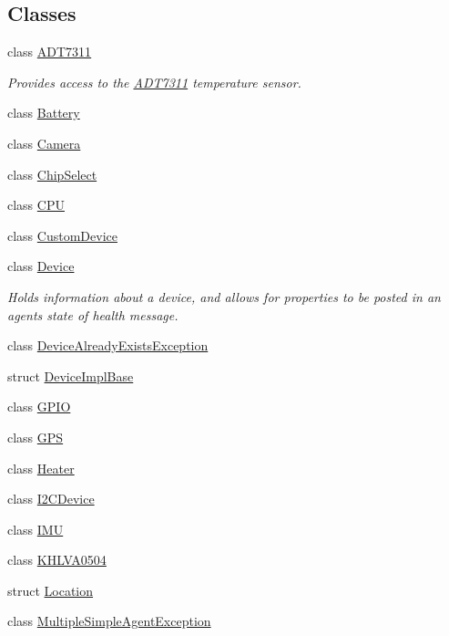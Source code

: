 \subsection*{Classes}
\begin{DoxyCompactItemize}
\item 
class \hyperlink{classcubesat_1_1ADT7311}{A\+D\+T7311}
\begin{DoxyCompactList}\small\item\em Provides access to the \hyperlink{classcubesat_1_1ADT7311}{A\+D\+T7311} temperature sensor. \end{DoxyCompactList}\item 
class \hyperlink{classcubesat_1_1Battery}{Battery}
\item 
class \hyperlink{classcubesat_1_1Camera}{Camera}
\item 
class \hyperlink{classcubesat_1_1ChipSelect}{Chip\+Select}
\item 
class \hyperlink{classcubesat_1_1CPU}{C\+PU}
\item 
class \hyperlink{classcubesat_1_1CustomDevice}{Custom\+Device}
\item 
class \hyperlink{classcubesat_1_1Device}{Device}
\begin{DoxyCompactList}\small\item\em Holds information about a device, and allows for properties to be posted in an agent\textquotesingle{}s state of health message. \end{DoxyCompactList}\item 
class \hyperlink{classcubesat_1_1DeviceAlreadyExistsException}{Device\+Already\+Exists\+Exception}
\item 
struct \hyperlink{structcubesat_1_1DeviceImplBase}{Device\+Impl\+Base}
\item 
class \hyperlink{classcubesat_1_1GPIO}{G\+P\+IO}
\item 
class \hyperlink{classcubesat_1_1GPS}{G\+PS}
\item 
class \hyperlink{classcubesat_1_1Heater}{Heater}
\item 
class \hyperlink{classcubesat_1_1I2CDevice}{I2\+C\+Device}
\item 
class \hyperlink{classcubesat_1_1IMU}{I\+MU}
\item 
class \hyperlink{classcubesat_1_1KHLVA0504}{K\+H\+L\+V\+A0504}
\item 
struct \hyperlink{structcubesat_1_1Location}{Location}
\item 
class \hyperlink{classcubesat_1_1MultipleSimpleAgentException}{Multiple\+Simple\+Agent\+Exception}

\end{DoxyCompactItemize}
